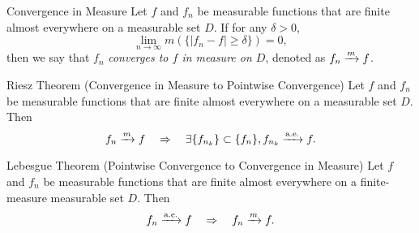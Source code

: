 \begin{definition}{Convergence in Measure}{}
  Let $f$ and $f_n$ be measurable functions that are finite almost everywhere on
  a measurable set $D$. If for any $\delta > 0$,
  \begin{equation}
    \lim \limits _{n \rightarrow \infty} m(\{|f_n - f| \geq \delta\}) = 0,
  \end{equation}
  then we say that $f_n$ \emph{converges to $f$ in measure on $D$},
  denoted as $f_n \xrightarrow{m} f$.
\end{definition}

\begin{theorem}{Riesz Theorem (Convergence in Measure to Pointwise Convergence)}{}
  Let $f$ and $f_n$ be measurable functions that are finite almost everywhere on
  a measurable set $D$. Then
  \begin{equation}
    f_n \xrightarrow{m} f \quad \Rightarrow \quad \exists \{f_{n_k}\} \subset \{f_n\}, f_{n_k} \xrightarrow{\text{a.e.}} f.
  \end{equation}
\end{theorem}

\begin{theorem}{Lebesgue Theorem (Pointwise Convergence to Convergence in Measure)}{}
  Let $f$ and $f_n$ be measurable functions that are finite almost everywhere on
  a finite-measure measurable set $D$. Then
  \begin{equation}
    f_n \xrightarrow{\text{a.e.}} f \quad \Rightarrow \quad f_n \xrightarrow{m} f.
  \end{equation}
\end{theorem}










